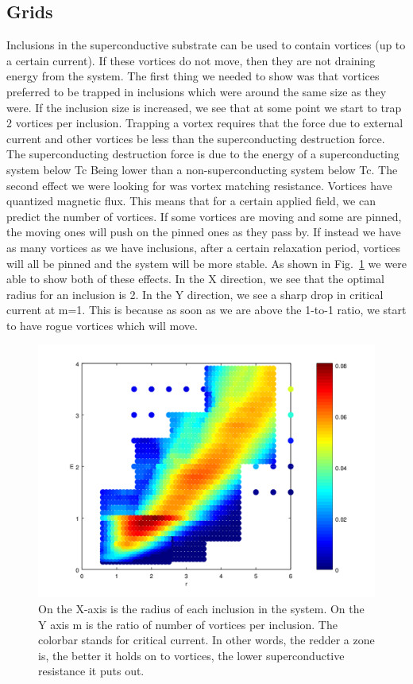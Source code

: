 \subsection{Grids}
Inclusions in the superconductive substrate can be used to contain vortices (up to a certain current). If these vortices do not move, then they are not draining energy from the system. The first thing we needed to show was that vortices preferred to be trapped in inclusions which were around the same size as they were. If the inclusion size is increased, we see that at some point we start to trap 2 vortices per inclusion. Trapping a vortex requires that the force due to external current and other vortices be less than the superconducting destruction force. The superconducting destruction force is due to the energy of a superconducting system below Tc Being lower than a non-superconducting system below Tc. The second effect we were looking for was vortex matching resistance. Vortices have quantized magnetic flux. This means that for a certain applied field, we can predict the number of vortices. If some vortices are moving and some are pinned, the moving ones will push on the pinned ones as they pass by. If instead we have as many vortices as we have inclusions, after a certain relaxation period, vortices will all be pinned and the system will be more stable. As shown in Fig.~\ref{HDF} we were able to show both of these effects. In the X direction, we see that the optimal radius for an inclusion is 2. In the Y direction, we see a sharp drop in critical current at m=1. This is because as soon as we are above the 1-to-1 ratio, we start to have rogue vortices which will move.

\begin{figure}[htbp]
\begin{center}
\includegraphics[scale=.50]{HDFinal.png}
\caption{ On the X-axis is the radius of each inclusion in the system. On the Y axis m is the ratio of number of vortices per inclusion. The colorbar stands for critical current. In other words, the redder a zone is, the better it holds on to vortices, the lower superconductive resistance it puts out.}
\label{HDF}
\end{center}
\end{figure}
 

